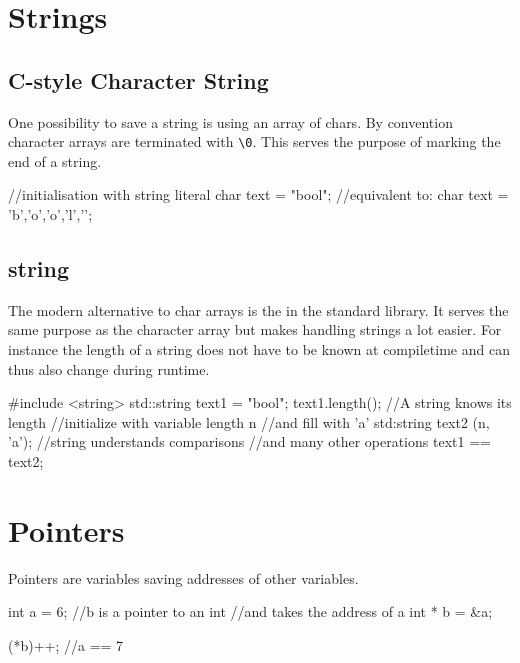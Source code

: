 \documentclass[10pt,a4paper]{scrartcl}
\begin{document}
\begin{multicols*}{2}
\section{Strings}
\label{sec:Strings}

\subsection{C-style Character String}
\label{sec:CStyleCharacterString}

One possibility to save a string is using an array of chars. By convention character arrays are terminated with \verb+\0+. This serves the purpose of marking the end of a string.

\begin{TPCpp}
//initialisation with string literal
char text = "bool";
//equivalent to:
char text = {'b','o','o','l','\0'};
\end{TPCpp}

\subsection{string}
\label{sec:string}

The modern alternative to char arrays is the  in the standard library. It serves the same purpose as the character array but makes handling strings a lot easier. For instance the length of a string does not have to be known at compiletime and can thus also change during runtime.

\begin{TPCpp}
#include <string>
std::string text1 = "bool";
text1.length(); //A string knows its length
//initialize with variable length n
//and fill with 'a'
std:string text2 (n, 'a');
//string understands comparisons
//and many other operations
text1 == text2; 
\end{TPCpp}

\section{Pointers}
\label{sec:Pointers}

Pointers are variables saving addresses of other variables.

\begin{TPCpp}
int a = 6;
//b is a pointer to an int
//and takes the address of a
int * b = &a;

(*b)++; //a == 7
\end{TPCpp}


\end{multicols*}
\end{document}
